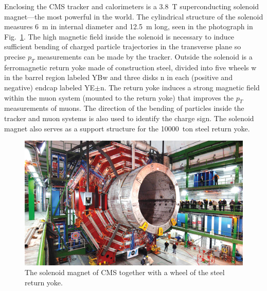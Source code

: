 

Enclosing the CMS tracker and calorimeters is a \SI{3.8}{T} superconducting solenoid magnet---the most powerful in the world. The cylindrical structure of the solenoid measures \SI{6}{m} in internal diameter and \SI{12.5}{m} long, seen in the photograph in Fig.~\ref{fig:Magnet}. The high magnetic field inside the solenoid is necessary to induce sufficient bending of charged particle trajectories in the transverse plane so precise $p_T$ measurements can be made by the tracker. Outside the solenoid is a ferromagnetic return yoke made of construction steel, divided into five wheels w in the barrel region labeled YBw and three disks n in each (positive and negative) endcap labeled YE$\pm$n. The return yoke induces a strong magnetic field within the muon system (mounted to the return yoke) that improves the $p_T$ measurements of muons. The direction of the bending of particles inside the tracker and muon systems is also used to identify the charge sign. The solenoid magnet also serves as a support structure for the \SI{10000}{ton} steel return yoke.

\begin{figure}[H]
    \centering
    \includegraphics[width=\textwidth]{Images/CMS/Magnet.jpg}
    \caption{The solenoid magnet of CMS together with a wheel of the steel return yoke.}
    \label{fig:Magnet}
\end{figure}
